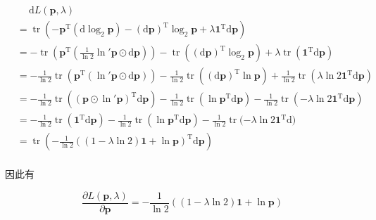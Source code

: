 \documentclass[answers]{exam}  %
\begin{document}
\begin{questions}
\begin{solution}
\begin{enumerate}
            $$
              \begin{aligned}
                 & \quad\ \mathrm{d} L(\bm{p}, \lambda)                                                                                                                                                                                                                            \\
                 & =\operatorname{tr}(-\bm{p}^{\mathrm{T}}(\mathrm{d}\log_2 \bm{p}) - (\mathrm{d}\bm{p})^{\mathrm{T}}\log_2 \bm{p} + \lambda \bm{1}^{\mathrm{T}}\mathrm{d}\bm{p})                                                                                                  \\
                 & = -\operatorname{tr}(\bm{p}^{\mathrm{T}}(\frac{1}{\ln 2}\ln' \bm{p} \odot \mathrm{d}\bm{p})) - \operatorname{tr}((\mathrm{d}\bm{p})^{\mathrm{T}}\log_2 \bm{p}) + \lambda \operatorname{tr}(\bm{1}^{\mathrm{T}}\mathrm{d}\bm{p})                                 \\
                 & = -\frac{1}{\ln 2}\operatorname{tr}(\bm{p}^{\mathrm{T}}(\ln' \bm{p} \odot \mathrm{d}\bm{p})) - \frac{1}{\ln 2}\operatorname{tr}((\mathrm{d}\bm{p})^{\mathrm{T}}\ln \bm{p})+ \frac{1}{\ln 2}\operatorname{tr}(\lambda \ln 2\bm{1}^{\mathrm{T}}\mathrm{d}\bm{p})  \\
                 & = -\frac{1}{\ln 2}\operatorname{tr}((\bm{p}\odot \ln' \bm{p})^{\mathrm{T}}\mathrm{d}\bm{p}) - \frac{1}{\ln 2}\operatorname{tr}(\ln \bm{p}^{\mathrm{T}} \mathrm{d}\bm{p})  - \frac{1}{\ln 2}\operatorname{tr}(-\lambda \ln 2\bm{1}^{\mathrm{T}}\mathrm{d}\bm{p}) \\
                 & = -\frac{1}{\ln 2}\operatorname{tr}(\bm{1}^{\mathrm{T}}\mathrm{d}\bm{p}) - \frac{1}{\ln 2}\operatorname{tr}(\ln \bm{p}^{\mathrm{T}} \mathrm{d}\bm{p})  - \frac{1}{\ln 2}\operatorname{tr}(-\lambda \ln 2\bm{1}^{\mathrm{T}}\mathrm{d}\bm)                       \\
                 & = \operatorname{tr}(- \frac{1}{\ln 2}((1-\lambda \ln 2)\bm{1}+\ln \bm{p})^{\mathrm{T}} \mathrm{d}\bm{p})                                                                                                                                                        \\
              \end{aligned}
            $$

            因此有

            $$
              \frac{\partial L(\bm{p}, \lambda)}{\partial \bm{p}} = - \frac{1}{\ln 2}((1-\lambda \ln 2)\bm{1}+\ln \bm{p})
            $$


\end{enumerate}
\end{solution}
\end{questions}
\end{document}
